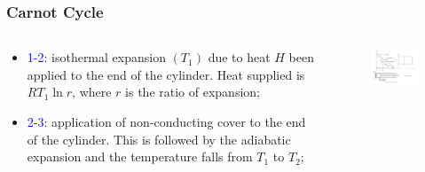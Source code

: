 \documentclass[10pt,compress]{beamer}
\begin{document}
\begin{frame}
 \frametitle{Carnot Cycle}
 \begin{columns}
  \begin{column}[c]{0.4\linewidth}
   \begin{itemize}
    \item <1-> \textcolor{blue}{1-2}: isothermal expansion $\left(T_{1}\right)$ due to heat $H$ been applied to the end of the cylinder. Heat supplied is $RT_{1}\ln r$, where $r$ is the ratio of expansion;
    \item <2-> \textcolor{blue}{2-3}: application of non-conducting cover to the end of the cylinder. This is followed by the adiabatic expansion and the temperature falls from $T_{1}$ to $T_{2}$;
   \end{itemize}
  \end{column}
  \begin{column}[c]{0.6\linewidth}
   \begin{figure}%
    \begin{center}
     \includegraphics[width=7.5cm,clip]{./Pics/GasCycle_CarnotCycle}
    \end{center}
   \end{figure}  
  \end{column}  
 \end{columns}
\end{frame}
\end{document}
